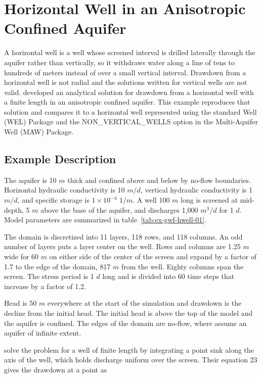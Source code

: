 \section{Horizontal Well in an Anisotropic Confined Aquifer}

A horizontal well is a well whose screened interval is drilled laterally through the aquifer rather than vertically, so it withdraws water along a line of tens to hundreds of meters instead of over a small vertical interval. Drawdown from a horizontal well is not radial and the solutions written for vertical wells are not valid. \cite{zhan2001} developed an analytical solution for drawdown from a horizontal well with a finite length in an anisotropic confined aquifer. This example reproduces that solution and compares it to a horizontal well represented using the standard Well (WEL) Package and the NON\_VERTICAL\_WELLS option in the \mf Multi-Aquifer Well (MAW) Package.

\subsection{Example Description}

The aquifer is 10 $m$ thick and confined above and below by no-flow boundaries. Horizontal hydraulic conductivity is 10 $m/d$, vertical hydraulic conductivity is 1 $m/d$, and specific storage is $1 \times 10^{-4}$ $1/m$. A well 100 $m$ long is screened at mid-depth, 5 $m$ above the base of the aquifer, and discharges 1,000 $m^3/d$ for 1 $d$. Model parameters are summarized in table~\ref{tab:ex-gwf-hwell-01}.

The domain is discretized into 11 layers, 118 rows, and 118 columns. An odd number of layers puts a layer center on the well. Rows and columns are 1.25 $m$ wide for 60 $m$ on either side of the center of the screen and expand by a factor of 1.7 to the edge of the domain, 817 $m$ from the well. Eighty columns span the screen. The stress period is 1 $d$ long and is divided into 60 time steps that increase by a factor of 1.2.

Head is 50 $m$ everywhere at the start of the simulation and drawdown is the decline from the initial head. The initial head is above the top of the model and the aquifer is confined. The edges of the domain are no-flow, where \cite{zhan2001} assume an aquifer of infinite extent.

\cite{zhan2001} solve the problem for a well of finite length by integrating a point sink along the axis of the well, which holds discharge uniform over the screen. Their equation 23 gives the drawdown at a point as

